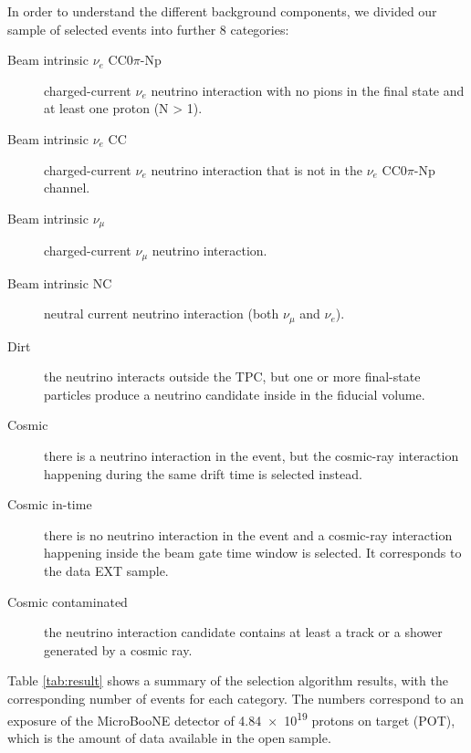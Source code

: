 In order to understand the different background components, we divided our sample of selected events into further 8 categories:
\begin{description}
\item[Beam intrinsic $\nu_{e}$ CC$0\pi$-Np] charged-current $\nu_{e}$ neutrino interaction with no pions in the final state and at least one proton (N > 1).
\item[Beam intrinsic $\nu_{e}$ CC] charged-current $\nu_{e}$ neutrino interaction that is not in the $\nu_{e}$ CC$0\pi$-Np channel.
\item[Beam intrinsic $\nu_{\mu}$] charged-current $\nu_{\mu}$ neutrino interaction.
\item[Beam intrinsic NC] neutral current neutrino interaction (both $\nu_{\mu}$ and $\nu_{e}$).
\item[Dirt] the neutrino interacts outside the TPC, but one or more final-state particles produce a neutrino candidate inside in the fiducial volume.
\item[Cosmic] there is a neutrino interaction in the event, but the cosmic-ray interaction happening during the same drift time is selected instead.
\item[Cosmic in-time] there is no neutrino interaction in the event and a cosmic-ray interaction happening inside the beam gate time window is selected. It corresponds to the data EXT sample.
\item[Cosmic contaminated] the neutrino interaction candidate contains at least a track or a shower generated by a cosmic ray.
\end{description}


Table \ref{tab:result} shows a summary of the selection algorithm results, with the corresponding number of events for each category. The numbers correspond to an exposure of the MicroBooNE detector of \num{4.84e19} protons on target (POT), which is the amount of data available in the open sample.

